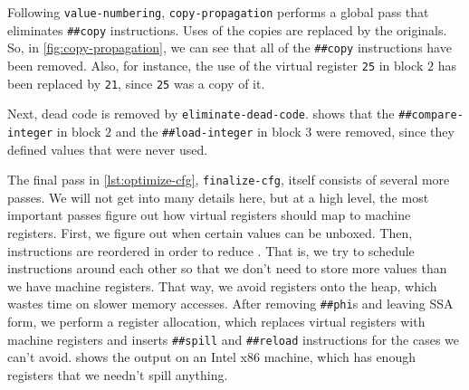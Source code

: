 
Following \Verb|value-numbering|, \Verb|copy-propagation| performs a global
pass that eliminates \Verb|##copy| instructions.  Uses of the copies are
replaced by the originals.  So, in \vref{fig:copy-propagation}, we can see that
all of the \Verb|##copy| instructions have been removed.  Also, for instance,
the use of the virtual register \Verb|25| in block $2$ has been replaced by
\Verb|21|, since \Verb|25| was a copy of it.


Next, dead code is removed by \Verb|eliminate-dead-code|.
 shows that the \Verb|##compare-integer| in
block $2$ and the \Verb|##load-integer| in block $3$ were removed, since they
defined values that were never used.


The final pass in \vref{lst:optimize-cfg}, \Verb|finalize-cfg|, itself consists
of several more passes.  We will not get into many details here, but at a high
level, the most important passes figure out how virtual registers should map to
machine registers.  First, we figure out when certain values can be unboxed.
Then, instructions are reordered in order to reduce .
That is, we try to schedule instructions around each other so that we don't
need to store more values than we have machine registers.  That way, we avoid
 registers onto the heap, which wastes time on slower memory
accesses.  After removing \Verb|##phi|s and leaving \gls{SSA} form, we perform
a  register allocation, which replaces virtual registers with
machine registers and inserts \Verb|##spill| and \Verb|##reload| instructions
for the cases we can't avoid.   shows the output on an
Intel x86 machine, which has enough registers that we needn't spill anything.

